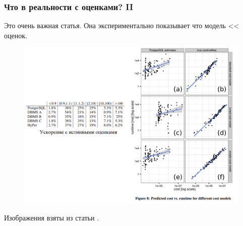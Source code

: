 \documentclass{beamer}
\begin{document}
\begin{frame}
	\frametitle{Что в реальности с оценками? II}
	\scriptsize
	Это очень важная статья. Она экспериментально показывает что модель << оценок.
	
	\begin{figure}[htb]
		\includegraphics[width=\textwidth,height=0.70\textheight,keepaspectratio]{estimates-vs-model.png} 
	\end{figure}			
	
	
	
	Изображения взяты из статьи \cite{Leis2015}.
	
\end{frame}
\end{document}
